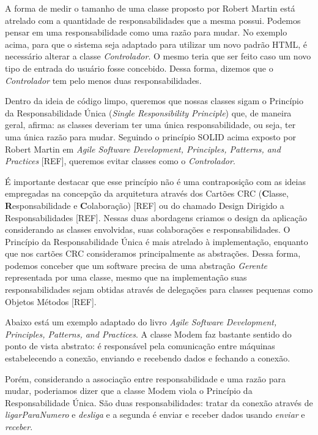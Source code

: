 A forma de medir o tamanho de uma classe proposto por Robert Martin está atrelado com a quantidade de responsabilidades que a mesma possui. Podemos pensar em uma responsabilidade como uma razão para mudar. No exemplo acima, para que o sistema seja adaptado para utilizar um novo padrão HTML, é necessário alterar a classe \textit{Controlador}. O mesmo teria que ser feito caso um novo tipo de entrada do usuário fosse concebido. Dessa forma, dizemos que o \textit{Controlador} tem pelo menos duas responsabilidades.
	
Dentro da ideia de código limpo, queremos que nossas classes sigam o Princípio da Responsabilidade Única (\textit{Single Responsibility Principle}) que, de maneira geral, afirma: as classes deveriam ter uma única responsabilidade, ou seja, ter uma única razão para mudar. Seguindo o princípio SOLID acima exposto por Robert Martin em \textit{Agile Software Development, Principles, Patterns, and Practices} [REF], queremos evitar classes como o \textit{Controlador}.

É importante destacar que esse princípio não é uma contraposição com as ideias empregadas na concepção da arquitetura através dos Cartões CRC (\textbf{C}lasse, \textbf{R}esponsabilidade e \textbf{C}olaboração) [REF] ou do chamado Design Dirigido a Responsabilidades [REF]. Nessas duas abordagens criamos o design da aplicação considerando as classes envolvidas, suas colaborações e responsabilidades. O Princípio da Responsabilidade Única é mais atrelado à implementação, enquanto que nos cartões CRC consideramos principalmente as abstrações. Dessa forma, podemos conceber que um software precisa de uma abstração \textit{Gerente} representada por uma classe, mesmo que na implementação suas responsabilidades sejam obtidas através de delegações para classes pequenas como Objetos Métodos [REF].

Abaixo está um exemplo adaptado do livro \textit{Agile Software Development, Principles, Patterns, and
Practices}. A classe Modem faz bastante sentido do ponto de vista abstrato: é responsável pela comunicação entre máquinas estabelecendo a conexão, enviando e recebendo dados e fechando a conexão.



Porém, considerando a associação entre responsabilidade e uma razão para mudar, poderiamos dizer que a classe
Modem viola o Princípio da Responsabilidade Única. São duas responsabilidades: tratar da conexão através de 
\textit{ligarParaNumero} e \textit{desliga} e a segunda é enviar e receber dados usando \textit{enviar} e
\textit{receber}.

